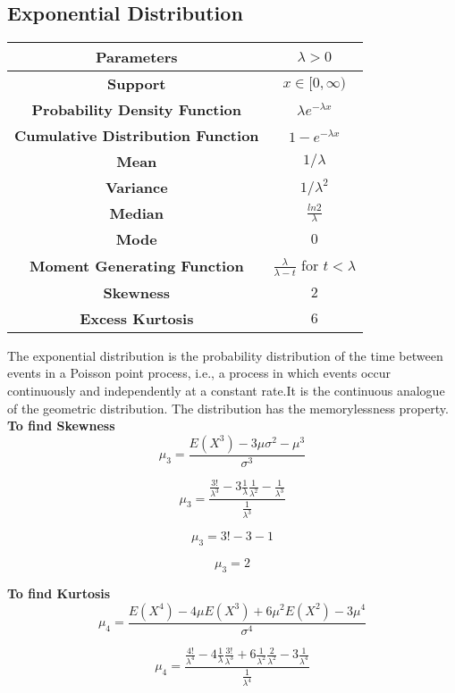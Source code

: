 \documentclass[14pt, a4paper]{article}
\theoremstyle{definition}
\begin{document}
\subsection{Exponential Distribution}


\begin{center}
    \begin{tabular}{|c|c|}  %
\hline
 \textbf{Parameters }& $\lambda > 0$ \\
 \hline
 \textbf{Support} &  $x \in [0, \infty ) $ \\
 \hline
 \textbf{Probability Density Function} & $\lambda e^{-\lambda x} $ \\
 \hline
 \textbf{Cumulative Distribution Function} &  $1 -  e^{-\lambda x}$\\
 \hline
 \textbf{Mean} & $1/\lambda $\\ 
 \hline
 \textbf{Variance} & $1/\lambda^2 $ \\
 \hline
 \textbf{Median} & $\frac{ln 2}{\lambda}$ \\ 
 \hline
 \textbf{Mode} & $0$\\
 \hline
 \textbf{Moment Generating Function} & $\frac{\lambda}{\lambda - t}$ for $t < \lambda $\\
 \hline
 \textbf{Skewness} & $2$ \\
 \hline
 \textbf{Excess Kurtosis} & $6$  \\
 \hline
       
  \end{tabular}
\end{center}

  
The exponential distribution is the probability distribution of the time between events in a Poisson point process, i.e., a process in which events occur continuously and independently at a constant rate.It is the continuous analogue of the geometric distribution. The distribution has the memorylessness property. 
\textbf{To find Skewness}
\[ \mu_3= \frac{E(X^3) - 3 \mu \sigma^2 - \mu^3}{ \sigma^3} \]

\[\mu_3 = \frac{\frac{3!}{\lambda^3} - 3 \frac{1}{\lambda}\frac{1}{\lambda^2} - \frac{1}{\lambda^3}}{\frac{1}{\lambda^3}}\]

\[\mu_3 = 3! - 3- 1\]

\[\mu_3 = 2\]


\textbf{To find Kurtosis}
\[ \mu_4 = \frac{ E(X^4) - 4 \mu E(X^3) + 6 \mu^2 E(X^2) - 3 \mu^4}{ \sigma^4} \]
 
\[\mu_4 = \frac{\frac{4!}{\lambda^4} - 4 \frac{1}{\lambda}\frac{3!}{\lambda^3} +6 \frac{1}{\lambda^2}\frac{2}{\lambda^2} - 3 \frac{1}{\lambda^4}}{\frac{1}{\lambda^4}}\]
  
\end{document}
